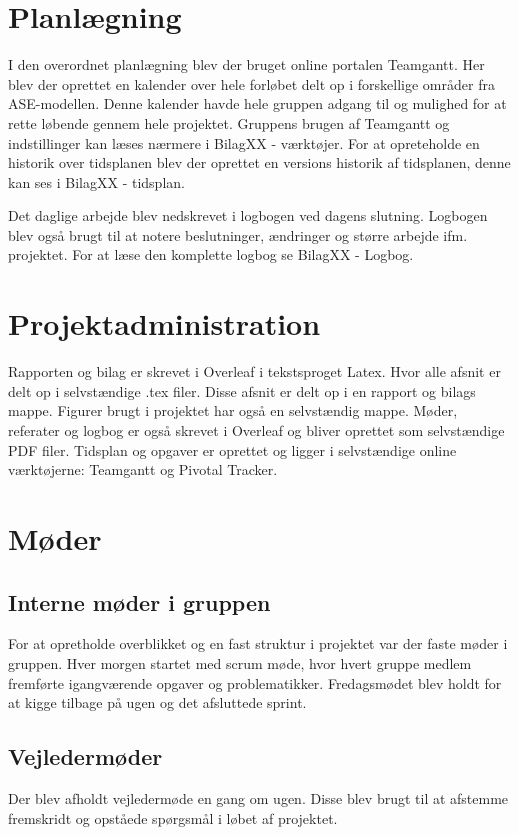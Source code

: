 \chapter{Planlægning}
I den overordnet planlægning blev der bruget online portalen Teamgantt. Her blev der oprettet en kalender over hele forløbet delt op i forskellige områder fra ASE-modellen. Denne kalender havde hele gruppen adgang til og mulighed for at rette løbende gennem hele projektet. Gruppens brugen af Teamgantt og indstillinger kan læses nærmere i BilagXX - værktøjer. For at opreteholde en historik over tidsplanen blev der oprettet en versions historik af tidsplanen, denne kan ses i BilagXX - tidsplan. 

Det daglige arbejde blev nedskrevet i logbogen ved dagens slutning. Logbogen blev også brugt til at notere beslutninger, ændringer og større arbejde ifm. projektet. For at læse den komplette logbog se BilagXX - Logbog.




\chapter{Projektadministration}
Rapporten og bilag er skrevet i Overleaf i tekstsproget Latex. Hvor alle afsnit er delt op i selvstændige .tex filer. Disse afsnit er delt op i en rapport og bilags mappe. Figurer brugt i projektet har også en selvstændig mappe. Møder, referater og logbog er også skrevet i Overleaf og bliver oprettet som selvstændige PDF filer. Tidsplan og opgaver er oprettet og ligger i selvstændige online værktøjerne: Teamgantt og Pivotal Tracker.    


\chapter{Møder}
\section{Interne møder i gruppen}
For at opretholde overblikket og en fast struktur i projektet var der faste møder i gruppen. Hver morgen startet med scrum møde, hvor hvert gruppe medlem fremførte igangværende opgaver og problematikker. Fredagsmødet blev holdt for at kigge tilbage på ugen og det afsluttede sprint. 

\section{Vejledermøder}
Der blev afholdt vejledermøde en gang om ugen. Disse blev brugt til at afstemme fremskridt og opståede spørgsmål i løbet af projektet.

